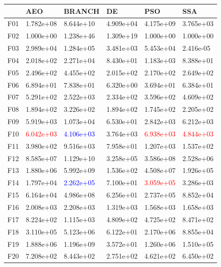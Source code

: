 \documentclass{article}
\begin{document}
\begin{table}[H]
	\centering
	\begin{tabular}{|l|lllll|}
		\hline
		{} &        AEO &     BRANCH &         DE &        PSO &        SSA \\
		\hline
		F01  &  1.782e+08 &  8.644e+10 &  4.909e+04 &  4.175e+09 &  3.765e+03 \\
		F02  &  1.000e+00 &  1.238e+46 &  1.309e+19 &  1.000e+00 &  1.000e+00 \\
		F03  &  2.989e+04 &  1.284e+05 &  3.481e+03 &  5.453e+04 &  2.416e-05 \\
		F04  &  2.018e+02 &  2.271e+04 &  8.430e+01 &  1.183e+03 &  8.388e+01 \\
		F05  &  2.496e+02 &  4.455e+02 &  2.015e+02 &  2.170e+02 &  2.649e+02 \\
		F06  &  6.894e+01 &  7.838e+01 &  6.320e+00 &  3.694e+01 &  6.384e+01 \\
		F07  &  5.291e+02 &  2.522e+03 &  2.334e+02 &  3.596e+02 &  4.609e+02 \\
		F08  &  1.894e+02 &  3.226e+02 &  1.894e+02 &  1.745e+02 &  2.205e+02 \\
		F09  &  5.919e+03 &  1.073e+04 &  6.530e+01 &  2.842e+03 &  6.212e+03 \\
		F10  &  \textcolor{red}{6.042e+03} &  \textcolor{blue}{4.106e+03} &  3.764e+03 &  \textcolor{red}{6.938e+03} &  \textcolor{red}{4.844e+03} \\
		F11  &  3.980e+02 &  9.516e+03 &  7.958e+01 &  1.207e+03 &  1.537e+02 \\
		F12  &  8.585e+07 &  1.129e+10 &  3.258e+05 &  3.586e+08 &  2.528e+06 \\
		F13  &  1.880e+06 &  5.992e+09 &  1.536e+02 &  4.508e+07 &  1.926e+05 \\
		F14  &  1.797e+04 &  \textcolor{blue}{2.262e+05} &  7.100e+01 &  \textcolor{red}{3.059e+05} &  3.286e+03 \\
		F15  &  6.164e+04 &  4.986e+08 &  6.256e+01 &  2.737e+05 &  8.852e+04 \\
		F16  &  2.008e+03 &  2.208e+03 &  1.319e+03 &  1.568e+03 &  1.658e+03 \\
		F17  &  8.224e+02 &  1.115e+03 &  4.809e+02 &  4.725e+02 &  8.471e+02 \\
		F18  &  3.110e+05 &  5.123e+06 &  6.122e+01 &  2.170e+06 &  8.855e+04 \\
		F19  &  1.888e+06 &  1.196e+09 &  3.572e+01 &  1.260e+06 &  1.510e+05 \\
		F20  &  7.208e+02 &  8.443e+02 &  2.751e+02 &  4.621e+02 &  6.450e+02 \\

\end{tabular}
\end{table}
\end{document}
